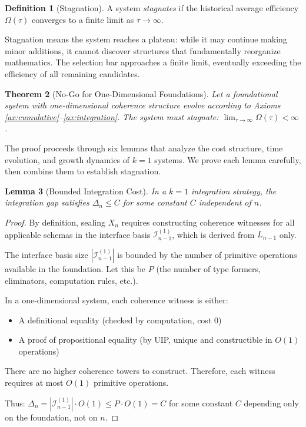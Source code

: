 \documentclass[11pt]{article}
\newtheorem{theorem}{Theorem}[section]
\newtheorem{lemma}[theorem]{Lemma}
\theoremstyle{definition}
\newtheorem{definition}[theorem]{Definition}
\theoremstyle{remark}
\begin{document}
\begin{definition}[Stagnation]
\label{def:stagnation}
A system \emph{stagnates} if the historical average efficiency $\Omega(\tau)$ converges to a finite limit as $\tau \to \infty$.
\end{definition}

Stagnation means the system reaches a plateau: while it may continue making minor additions, it cannot discover structures that fundamentally reorganize mathematics. The selection bar approaches a finite limit, eventually exceeding the efficiency of all remaining candidates.

\begin{theorem}[No-Go for One-Dimensional Foundations]
\label{thm:k1-nogo}
Let a foundational system with one-dimensional coherence structure evolve according to Axioms \ref{ax:cumulative}--\ref{ax:integration}. The system must stagnate: $\lim_{\tau \to \infty} \Omega(\tau) < \infty$.
\end{theorem}

The proof proceeds through six lemmas that analyze the cost structure, time evolution, and growth dynamics of $k = 1$ systems. We prove each lemma carefully, then combine them to establish stagnation.

\begin{lemma}[Bounded Integration Cost]
\label{lem:bounded-integration}
In a $k = 1$ integration strategy, the integration gap satisfies $\Delta_n \leq C$ for some constant $C$ independent of $n$.
\end{lemma}

\begin{proof}
By definition, sealing $X_n$ requires constructing coherence witnesses for all applicable schemas in the interface basis $\mathcal{I}_{n-1}^{(1)}$, which is derived from $L_{n-1}$ only.

The interface basis size $|\mathcal{I}_{n-1}^{(1)}|$ is bounded by the number of primitive operations available in the foundation. Let this be $P$ (the number of type formers, eliminators, computation rules, etc.).

In a one-dimensional system, each coherence witness is either:
\begin{itemize}
\item A definitional equality (checked by computation, cost 0)
\item A proof of propositional equality (by UIP, unique and constructible in $O(1)$ operations)
\end{itemize}

There are no higher coherence towers to construct. Therefore, each witness requires at most $O(1)$ primitive operations.

Thus: $\Delta_n = |\mathcal{I}_{n-1}^{(1)}| \cdot O(1) \leq P \cdot O(1) = C$ for some constant $C$ depending only on the foundation, not on $n$.
\end{proof}
\end{document}
